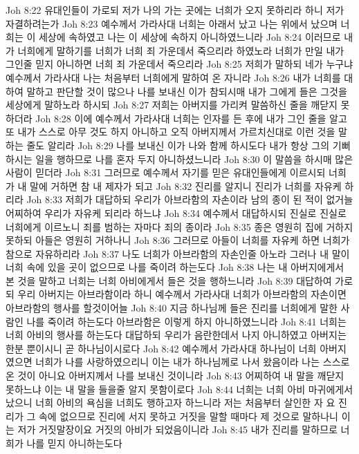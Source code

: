 Joh 8:22  유대인들이 가로되 저가 나의 가는 곳에는 너희가 오지 못하리라 하니 저가 자결하려는가
Joh 8:23  예수께서 가라사대 너희는 아래서 났고 나는 위에서 났으며 너희는 이 세상에 속하였고 나는 이 세상에 속하지 아니하였느니라
Joh 8:24  이러므로 내가 너희에게 말하기를 너희가 너희 죄 가운데서 죽으리라 하였노라 너희가 만일 내가 그인줄 믿지 아니하면 너희 죄 가운데서 죽으리라
Joh 8:25  저희가 말하되 네가 누구냐 예수께서 가라사대 나는 처음부터 너희에게 말하여 온 자니라
Joh 8:26  내가 너희를 대하여 말하고 판단할 것이 많으나 나를 보내신 이가 참되시매 내가 그에게 들은 그것을 세상에게 말하노라 하시되
Joh 8:27  저희는 아버지를 가리켜 말씀하신 줄을 깨닫지 못하더라
Joh 8:28  이에 예수께서 가라사대 너희는 인자를 든 후에 내가 그인 줄을 알고 또 내가 스스로 아무 것도 하지 아니하고 오직 아버지께서 가르치신대로 이런 것을 말하는 줄도 알리라
Joh 8:29  나를 보내신 이가 나와 함께 하시도다 내가 항상 그의 기뻐하시는 일을 행하므로 나를 혼자 두지 아니하셨느니라
Joh 8:30  이 말씀을 하시매 많은 사람이 믿더라
Joh 8:31  그러므로 예수께서 자기를 믿은 유대인들에게 이르시되 너희가 내 말에 거하면 참 내 제자가 되고
Joh 8:32  진리를 알지니 진리가 너희를 자유케 하리라
Joh 8:33  저희가 대답하되 우리가 아브라함의 자손이라 남의 종이 된 적이 없거늘 어찌하여 우리가 자유케 되리라 하느냐
Joh 8:34  예수께서 대답하시되 진실로 진실로 너희에게 이르노니 죄를 범하는 자마다 죄의 종이라
Joh 8:35  종은 영원히 집에 거하지 못하되 아들은 영원히 거하나니
Joh 8:36  그러므로 아들이 너희를 자유케 하면 너희가 참으로 자유하리라
Joh 8:37  나도 너희가 아브라함의 자손인줄 아노라 그러나 내 말이 너희 속에 있을 곳이 없으므로 나를 죽이려 하는도다
Joh 8:38  나는 내 아버지에게서 본 것을 말하고 너희는 너희 아비에게서 들은 것을 행하느니라
Joh 8:39  대답하여 가로되 우리 아버지는 아브라함이라 하니 예수께서 가라사대 너희가 아브라함의 자손이면 아브라함의 행사를 할것이어늘
Joh 8:40  지금 하나님께 들은 진리를 너희에게 말한 사람인 나를 죽이려 하는도다 아브라함은 이렇게 하지 아니하였느니라
Joh 8:41  너희는 너희 아비의 행사를 하는도다 대답하되 우리가 음란한데서 나지 아니하였고 아버지는 한분 뿐이시니 곧 하나님이시로다
Joh 8:42  예수께서 가라사대 하나님이 너희 아버지였으면 너희가 나를 사랑하였으리니 이는 내가 하나님께로 나서 왔음이라 나는 스스로 온 것이 아니요 아버지께서 나를 보내신 것이니라
Joh 8:43  어찌하여 내 말을 깨닫지 못하느냐 이는 내 말을 들을줄 알지 못함이로다
Joh 8:44  너희는 너희 아비 마귀에게서 났으니 너희 아비의 욕심을 너희도 행하고자 하느니라 저는 처음부터 살인한 자 요 진리가 그 속에 없으므로 진리에 서지 못하고 거짓을 말할 때마다 제 것으로 말하나니 이는 저가 거짓말장이요 거짓의 아비가 되었음이니라
Joh 8:45  내가 진리를 말하므로 너희가 나를 믿지 아니하는도다
